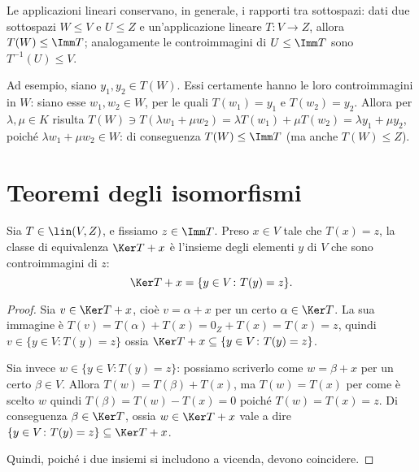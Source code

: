 \begin{osservazione} \label{o:applicazioni-sottospazi}
	Le applicazioni lineari conservano, in generale, i rapporti tra sottospazi: dati due sottospazi $W\le V$ e $U\le Z$ e un'applicazione lineare $T\colon V\to Z$, allora $T(W)\leq \Imm T$; analogamente le controimmagini di $U\le \Imm T$ sono $T^{-1}(U)\leq V$.

	Ad esempio, siano $y_1,y_2\in T(W)$.
	Essi certamente hanno le loro controimmagini in $W$: siano esse $w_1,w_2\in W$, per le quali $T(w_1)=y_1$ e $T(w_2)=y_2$.
	Allora per $\lambda,\mu\in K$ risulta $T(W)\ni T(\lambda w_1+\mu w_2)=\lambda T(w_1)+\mu T(w_2)=\lambda y_1+\mu y_2$, poiché $\lambda w_1+\mu w_2\in W$: di conseguenza $T(W)\le\Imm T$ (ma anche $T(W)\le Z$).
\end{osservazione}

\section{Teoremi degli isomorfismi}
\begin{teorema}
	Sia $T\in\lin(V,Z)$, e fissiamo $z\in \Imm T$.
	Preso $x\in V$ tale che $T(x)=z$, la classe di equivalenza $\Ker T+x$ è l'insieme degli elementi $y$ di $V$ che sono controimmagini di $z$:
	\begin{equation*}
		 \Ker T+x=\{y\in V\colon T(y)=z\}.
	\end{equation*}
\end{teorema}
\begin{proof}
	Sia $v\in\Ker T+x$, cioè $v=\alpha+x$ per un certo $\alpha\in\Ker T$.
	La sua immagine è $T(v)=T(\alpha)+T(x)=0_Z+T(x)=T(x)=z$, quindi $v\in\{y\in V\colon T(y)=z\}$ ossia $\Ker T+x\subseteq\{y\in V\colon T(y)=z\}$.

	Sia invece $w\in\{y\in V\colon T(y)=z\}$: possiamo scriverlo come $w=\beta+x$ per un certo $\beta\in V$.
	Allora $T(w)=T(\beta)+T(x)$, ma $T(w)=T(x)$ per come è scelto $w$ quindi $T(\beta)=T(w)-T(x)=0$ poich\'e $T(w)=T(x)=z$.
	Di conseguenza $\beta\in\Ker T$, ossia $w\in\Ker T+x$ vale a dire $\{y\in V\colon T(y)=z\}\subseteq\Ker T+x$.

	Quindi, poiché i due insiemi si includono a vicenda, devono coincidere.
\end{proof}

